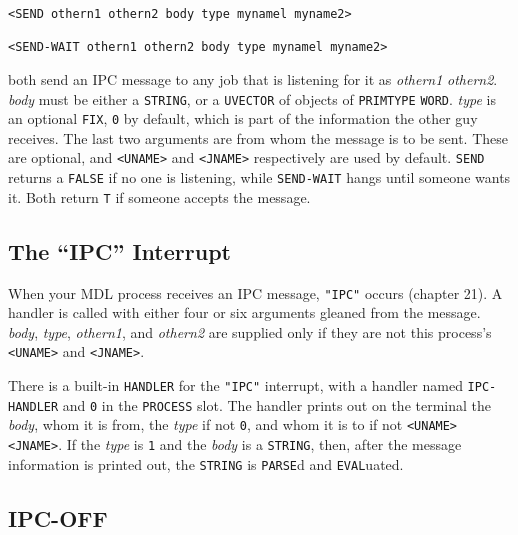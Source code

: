 \documentclass[a4paper]{scrbook}
\begin{document}
\begin{verbatim}
<SEND othern1 othern2 body type mynamel myname2>

<SEND-WAIT othern1 othern2 body type mynamel myname2>
\end{verbatim}

 both send an IPC message to any job that is listening for it as \emph{othern1} \emph{othern2}.
\emph{body} must be either a \texttt{STRING}, or a \texttt{UVECTOR} of objects of \texttt{PRIMTYPE} \texttt{WORD}.
\emph{type} is an optional \texttt{FIX}, \texttt{0} by default, which is part of the information the other guy receives.
The last two arguments are from whom the message is to be sent. These are optional, and
\texttt{\textless{}UNAME\textgreater{}} and \texttt{\textless{}JNAME\textgreater{}} respectively are used by default.
\texttt{SEND} returns a \texttt{FALSE} if no one is listening, while \texttt{SEND-WAIT}
hangs until someone wants it. Both return \texttt{T} if someone accepts the message.

\subsection{\texorpdfstring{The ``IPC'' Interrupt}{23.4.2. The IPC Interrupt}}\label{the-ipc-interrupt}

When your MDL process receives an IPC message, \texttt{"IPC"}  occurs (chapter 21). A
handler is called with either four or six arguments gleaned from the message. \emph{body}, \emph{type}, \emph{othern1}, and
\emph{othern2} are supplied only if they are not this process's \texttt{\textless{}UNAME\textgreater{}} and
\texttt{\textless{}JNAME\textgreater{}}.

There is a built-in \texttt{HANDLER} for the \texttt{"IPC"} interrupt, with a handler named
\texttt{IPC-HANDLER} and \texttt{0} in the \texttt{PROCESS} slot. The handler prints out
on the terminal the \emph{body}, whom it is from, the \emph{type} if not \texttt{0}, and whom it is to if not
\texttt{\textless{}UNAME\textgreater{}} \texttt{\textless{}JNAME\textgreater{}}. If the \emph{type} is \texttt{1} and the
\emph{body} is a \texttt{STRING}, then, after the message information is printed out, the \texttt{STRING} is
\texttt{PARSE}d and \texttt{EVAL}uated.

\subsection{IPC-OFF}\label{ipc-off}
\end{document}
